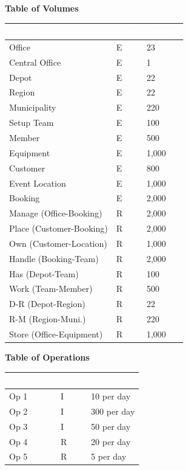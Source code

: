 \documentclass[12pt,a4paper]{article}
\begin{document}
\vspace{0.5cm}

\noindent\textbf{Table of Volumes} \\
\renewcommand{\arraystretch}{1.15}
\small
\begin{tabularx}{\textwidth}{|Y|P{0.10\textwidth}|P{0.18\textwidth}|}
    \hline
    \textcolor{white}{\textbf{Concept}} & \textcolor{white}{\textbf{Type}} & \textcolor{white}{\textbf{Volume}} \\ \hline
    Office & E & 23 \\ \hline
    Central Office & E & 1 \\ \hline
    Depot & E & 22 \\ \hline
    Region & E & 22 \\ \hline
    Municipality & E & 220 \\ \hline
    Setup Team & E & 100 \\ \hline
    Member & E & 500 \\ \hline
    Equipment & E & 1,000 \\ \hline
    Customer & E & 800 \\ \hline
    Event Location & E & 1,000 \\ \hline
    Booking & E & 2,000 \\ \hline
    Manage (Office-Booking) & R & 2,000 \\ \hline
    Place (Customer-Booking) & R & 2,000 \\ \hline
    Own (Customer-Location) & R & 1,000 \\ \hline
    Handle (Booking-Team) & R & 2,000 \\ \hline
    Has (Depot-Team) & R & 100 \\ \hline
    Work (Team-Member) & R & 500 \\ \hline
    D-R (Depot-Region) & R & 22 \\ \hline
    R-M (Region-Muni.) & R & 220 \\ \hline
    Store (Office-Equipment) & R & 1,000 \\ \hline
\end{tabularx}

\vspace{0.5cm}

\noindent\textbf{Table of Operations} \\
\renewcommand{\arraystretch}{1.2}
\small
\begin{tabularx}{0.72\textwidth}{|Y|P{0.12\textwidth}|P{0.22\textwidth}|}
    \hline
    \textcolor{white}{\textbf{Operation}} & \textcolor{white}{\textbf{Type}} & \textcolor{white}{\textbf{Frequency}} \\ \hline
    Op 1 & I & 10 per day \\ \hline
    Op 2 & I & 300 per day \\ \hline
    Op 3 & I & 50 per day \\ \hline
    Op 4 & R & 20 per day \\ \hline
    Op 5 & R & 5 per day \\ \hline
\end{tabularx}
\vspace{0.5cm}
\end{document}
